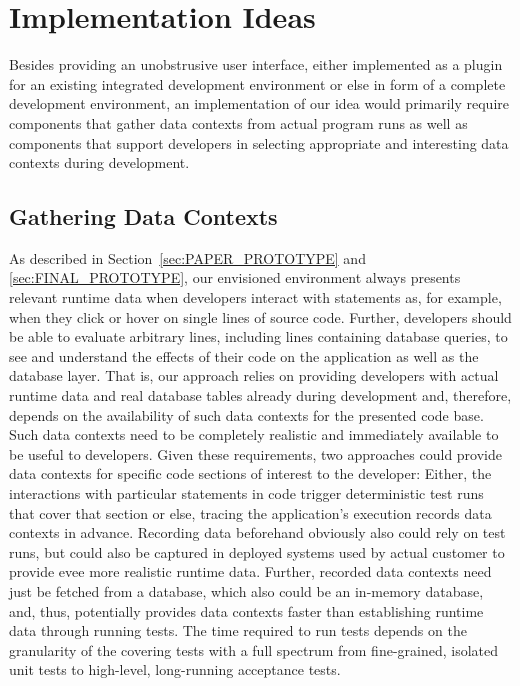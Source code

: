 \section{Implementation Ideas} \label{sec:IMPLEMENTATION_IDEAS}
Besides providing an unobstrusive user interface, either implemented as a plugin for an existing integrated development environment or else in form of a complete development environment, an implementation of our idea would primarily require components that gather data contexts from actual program runs as well as components that support developers in selecting appropriate and interesting data contexts during development.

\subsection{Gathering Data Contexts}
As described in Section~\ref{sec:PAPER_PROTOTYPE} and \ref{sec:FINAL_PROTOTYPE}, our envisioned environment always presents relevant runtime data when developers interact with statements as, for example, when they click or hover on single lines of source code.
Further, developers should be able to evaluate arbitrary lines, including lines containing database queries, to see and understand the effects of their code on the application as well as the database layer.
That is, our approach relies on providing developers with actual runtime data and real database tables already during development and, therefore, depends on the availability of such data contexts for the presented code base.
Such data contexts need to be completely realistic and immediately available to be useful to developers.
Given these requirements, two approaches could provide data contexts for specific code sections of interest to the developer:
Either, the interactions with particular statements in code trigger deterministic test runs that cover that section or else, tracing the application's execution records data contexts in advance.
Recording data beforehand obviously also could rely on test runs, but could also be captured in deployed systems used by actual customer to provide evee more realistic runtime data.
Further, recorded data contexts need just be fetched from a database, which also could be an in-memory database, and, thus, potentially provides data contexts faster than establishing runtime data through running tests.
The time required to run tests depends on the granularity of the covering tests with a full spectrum from fine-grained, isolated unit tests to high-level, long-running acceptance tests.
